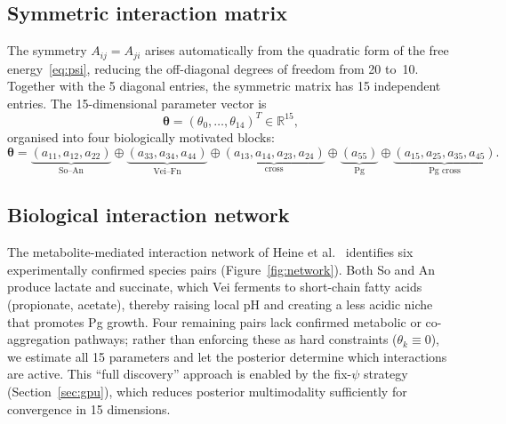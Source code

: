 \documentclass[11pt,a4paper]{article}
\newcommand{\btheta}{\boldsymbol{\theta}}
\newcommand{\Real}{\mathbb{R}}
\begin{document}
\subsection{Symmetric interaction matrix}
\label{sec:model_matrix}

The symmetry $A_{ij}=A_{ji}$ arises automatically from the quadratic form of the free energy~\eqref{eq:psi}, reducing the off-diagonal degrees of freedom from 20 to~10.
Together with the 5 diagonal entries, the symmetric matrix has 15 independent entries.
The 15-dimensional parameter vector is
\begin{equation}
\btheta = (\theta_0,\dots,\theta_{14})^T \in \Real^{15},
\label{eq:theta}
\end{equation}
organised into four biologically motivated blocks:
\begin{equation}
\btheta =
\underbrace{(a_{11},a_{12},a_{22})}_{\text{So--An}}
\oplus
\underbrace{(a_{33},a_{34},a_{44})}_{\text{Vei--Fn}}
\oplus
\underbrace{(a_{13},a_{14},a_{23},a_{24})}_{\text{cross}}
\oplus
\underbrace{(a_{55})}_{\text{Pg}}
\oplus
\underbrace{(a_{15},a_{25},a_{35},a_{45})}_{\text{Pg cross}}.
\label{eq:blocks}
\end{equation}

\subsection{Biological interaction network}

The metabolite-mediated interaction network of Heine et al.~\cite{Heine2025PeriImplant} identifies six experimentally confirmed species pairs (Figure~\ref{fig:network}).
Both So and An produce lactate and succinate, which Vei ferments to short-chain fatty acids (propionate, acetate), thereby raising local pH and creating a less acidic niche that promotes Pg growth.
Four remaining pairs lack confirmed metabolic or co-aggregation pathways; rather than enforcing these as hard constraints ($\theta_k\equiv0$), we estimate all 15 parameters and let the posterior determine which interactions are active.
This ``full discovery'' approach is enabled by the fix-$\psi$ strategy (Section~\ref{sec:gpu}), which reduces posterior multimodality sufficiently for convergence in 15 dimensions.
\end{document}
